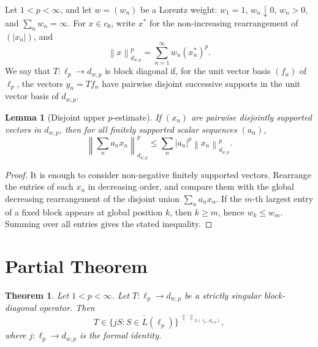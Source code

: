 \documentclass[11pt]{article}
\newtheorem{theorem}{Theorem}
\newtheorem{lemma}{Lemma}
\newcommand{\norm}[1]{\left\lVert #1\right\rVert}
\begin{document}
Let $1<p<\infty$, and let $w=(w_n)$ be a Lorentz weight:
$w_1=1$, $w_n\downarrow0$, $w_n>0$, and $\sum_n w_n=\infty$.  For
$x\in c_0$, write $x^*$ for the non-increasing rearrangement of
$(|x_n|)$, and
\[
  \norm{x}_{d_{w,p}}^p=\sum_{n=1}^{\infty}w_n(x_n^*)^p.
\]
We say that $T:\ell_p\to d_{w,p}$ is block diagonal if, for the unit vector
basis $(f_n)$ of $\ell_p$, the vectors $y_n=Tf_n$ have pairwise disjoint
successive supports in the unit vector basis of $d_{w,p}$.

\begin{lemma}[Disjoint upper $p$-estimate]\label{lem:upper}
If $(x_n)$ are pairwise disjointly supported vectors in $d_{w,p}$, then for
all finitely supported scalar sequences $(a_n)$,
\[
  \norm{\sum_n a_nx_n}_{d_{w,p}}^p
  \leq
  \sum_n |a_n|^p\norm{x_n}_{d_{w,p}}^p .
\]
\end{lemma}

\begin{proof}
It is enough to consider non-negative finitely supported vectors.  Rearrange
the entries of each $x_n$ in decreasing order, and compare them with the
global decreasing rearrangement of the disjoint union
$\sum_n a_nx_n$.  If the $m$-th largest entry of a fixed block appears at
global position $k$, then $k\geq m$, hence $w_k\leq w_m$.  Summing over all
entries gives the stated inequality.
\end{proof}

\section*{Partial Theorem}

\begin{theorem}
Let $1<p<\infty$.  Let $T:\ell_p\to d_{w,p}$ be a strictly singular
block-diagonal operator.  Then
\[
  T\in \overline{\{jS:S\in L(\ell_p)\}}^{\ \norm{\cdot}_{L(\ell_p,d_{w,p})}},
\]
where $j:\ell_p\to d_{w,p}$ is the formal identity.
\end{theorem}
\end{document}
